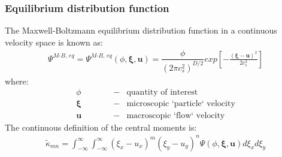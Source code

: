 \documentclass[10pt]{beamer}
\begin{document}
\begin{frame}\frametitle{Equilibrium distribution function}
The Maxwell-Boltzmann equilibrium distribution function in a continuous velocity space is known as:
\begin{eqnarray}  
\Psi^{\textit{M-B, eq}} = 
\Psi^{\textit{M-B, eq}}(\phi, \boldsymbol{\xi}, \boldsymbol{u}) =
\dfrac{\phi}{(2 \pi c_s^2)^{D/2}} 
exp \left[
-\frac{(\boldsymbol{\xi}-\boldsymbol{u})^2}{2 c_s^2}
\right] \nonumber \label{eq:Maxwellian}
\end{eqnarray}
where: 
\begin{eqnarray}
\phi  \hspace{3em} &-& \text{quantity of interest} \nonumber \\
\boldsymbol{\xi} \hspace{3em} &-& \text{microscopic `particle` velocity} \nonumber \\
\boldsymbol{u} \hspace{3em} &-& \text{macroscopic `flow` velocity} \nonumber
\end{eqnarray} 
The continuous definition of the central moments is:
\begin{eqnarray}  
\tilde{\kappa}_{mn} = \int_{-\infty}^{\infty} \int_{-\infty}^{\infty} 
(\xi_x - u_x)^m (\xi_y -u_y)^n
\Psi(\phi, \boldsymbol{\xi}, \boldsymbol{u}) 
d \xi_x d \xi_y \nonumber \label{eq:cont_cm_mom_def}
\end{eqnarray}
\end{frame}
\end{document}
